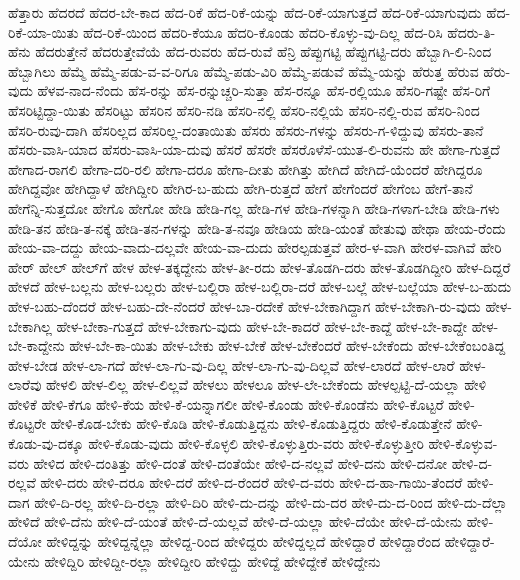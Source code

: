 ಹೆತ್ತಾರು
ಹೆದರದೆ
ಹೆದರ-ಬೇ-ಕಾದ
ಹೆದ-ರಿಕೆ
ಹೆದ-ರಿಕೆ-ಯನ್ನು
ಹೆದ-ರಿಕೆ-ಯಾಗುತ್ತದೆ
ಹೆದ-ರಿಕೆ-ಯಾಗುವುದು
ಹೆದ-ರಿಕೆ-ಯಾ-ಯಿತು
ಹೆದ-ರಿಕೆ-ಯಿಂದ
ಹೆದರಿ-ಕೆಯೂ
ಹೆದರಿ-ಕೊಂಡು
ಹೆದರಿ-ಕೊಳ್ಳು-ವು-ದಿಲ್ಲ
ಹೆದ-ರಿಸಿ
ಹೆದರು-ತಿ-ಹೆನು
ಹೆದರುತ್ತೇನೆ
ಹೆದರುತ್ತೇವೆಯೆ
ಹೆದ-ರುವರು
ಹೆದ-ರುವೆ
ಹೆನ್ರಿ
ಹೆಪ್ಪುಗಟ್ಟಿ
ಹೆಪ್ಪುಗಟ್ಟಿ-ದರು
ಹೆಬ್ಬಾಗಿ-ಲಿ-ನಿಂದ
ಹೆಬ್ಬಾಗಿಲು
ಹೆಮ್ಮೆ
ಹೆಮ್ಮೆ-ಪಡು-ವ-ವ-ರಿಗೂ
ಹೆಮ್ಮೆ-ಪಡು-ವಿರಿ
ಹೆಮ್ಮೆ-ಪಡುವೆ
ಹೆಮ್ಮೆ-ಯನ್ನು
ಹೆರುತ್ತ
ಹೆರುವ
ಹೆರು-ವುದು
ಹೆಳವ-ನಾದ-ನೆಂದು
ಹೆಸ-ರನ್ನು
ಹೆಸ-ರನ್ನುಚ್ಚರಿ-ಸುತ್ತಾ
ಹೆಸ-ರನ್ನೂ
ಹೆಸ-ರಲ್ಲಿಯೂ
ಹೆಸರಿ-ಗಷ್ಟೇ
ಹೆಸ-ರಿಗೆ
ಹೆಸರಿಟ್ಟಿದ್ದಾ-ಯಿತು
ಹೆಸರಿಟ್ಟು
ಹೆಸರಿನ
ಹೆಸರಿ-ನಡಿ
ಹೆಸರಿ-ನಲ್ಲಿ
ಹೆಸರಿ-ನಲ್ಲಿಯೆ
ಹೆಸರಿ-ನಲ್ಲಿ-ರುವ
ಹೆಸರಿ-ನಿಂದ
ಹೆಸರಿ-ರುವು-ದಾಗಿ
ಹೆಸರಿಲ್ಲದ
ಹೆಸರಿಲ್ಲ-ದಂತಾಯಿತು
ಹೆಸರು
ಹೆಸರು-ಗಳನ್ನು
ಹೆಸರು-ಗ-ಳಿದ್ದುವು
ಹೆಸರು-ತಾನೆ
ಹೆಸರು-ವಾಸಿ-ಯಾದ
ಹೆಸರು-ವಾಸಿ-ಯಾ-ದುವು
ಹೆಸರೆ
ಹೆಸರೇ
ಹೆಸರೊಳೆಸೆ-ಯುತ-ಲಿ-ರುವನು
ಹೇ
ಹೇಗಾ-ಗುತ್ತದೆ
ಹೇಗಾದ-ರಾಗಲಿ
ಹೇಗಾ-ದರಿ-ರಲಿ
ಹೇಗಾ-ದರೂ
ಹೇಗಾ-ದೀತು
ಹೇಗಿತ್ತು
ಹೇಗಿದೆ
ಹೇಗಿದೆ-ಯೆಂದರೆ
ಹೇಗಿದ್ದರೂ
ಹೇಗಿದ್ದವೋ
ಹೇಗಿದ್ದಾಳೆ
ಹೇಗಿದ್ದೀರಿ
ಹೇಗಿರ-ಬ-ಹುದು
ಹೇಗಿ-ರುತ್ತದೆ
ಹೇಗೆ
ಹೇಗೆಂದರೆ
ಹೇಗೆಂಬ
ಹೇಗೆ-ತಾನೆ
ಹೇಗೆನ್ನಿ-ಸುತ್ತದೋ
ಹೇಗೊ
ಹೇಗೋ
ಹೇಡಿ
ಹೇಡಿ-ಗಲ್ಲ
ಹೇಡಿ-ಗಳ
ಹೇಡಿ-ಗಳನ್ನಾಗಿ
ಹೇಡಿ-ಗಳಾಗ-ಬೇಡಿ
ಹೇಡಿ-ಗಳು
ಹೇಡಿ-ತನ
ಹೇಡಿ-ತ-ನಕ್ಕೆ
ಹೇಡಿ-ತನ-ಗಳನ್ನು
ಹೇಡಿ-ತ-ನವೂ
ಹೇಡಿಯ
ಹೇಡಿ-ಯಂತೆ
ಹೇತುವು
ಹೇಥಾ
ಹೇಯ-ರೆಂದು
ಹೇಯ-ವಾ-ದದ್ದು
ಹೇಯ-ವಾದು-ದಲ್ಲವೇ
ಹೇಯ-ವಾ-ದುದು
ಹೇರಲ್ಪಡುತ್ತವೆ
ಹೇರ-ಳ-ವಾಗಿ
ಹೇರಳ-ವಾಗಿವೆ
ಹೇರಿ
ಹೇರ್‌
ಹೇಲ್
ಹೇಲ್‌ಗೆ
ಹೇಳ
ಹೇಳ-ತಕ್ಕದ್ದೇನು
ಹೇಳ-ತೀ-ರದು
ಹೇಳ-ತೊಡಗಿ-ದರು
ಹೇಳ-ತೊಡಗಿದ್ದೀರಿ
ಹೇಳ-ದಿದ್ದರೆ
ಹೇಳದೆ
ಹೇಳ-ಬಲ್ಲನು
ಹೇಳ-ಬಲ್ಲರು
ಹೇಳ-ಬಲ್ಲಿರಾ
ಹೇಳ-ಬಲ್ಲಿರಾ-ದರೆ
ಹೇಳ-ಬಲ್ಲೆ
ಹೇಳ-ಬಲ್ಲೆಯಾ
ಹೇಳ-ಬ-ಹುದು
ಹೇಳ-ಬಹು-ದೆಂದರೆ
ಹೇಳ-ಬಹು-ದೇ-ನೆಂದರೆ
ಹೇಳ-ಬಾ-ರದೇಕೆ
ಹೇಳ-ಬೇಕಾಗಿದ್ದಾಗ
ಹೇಳ-ಬೇಕಾಗಿ-ರು-ವುದು
ಹೇಳ-ಬೇಕಾಗಿಲ್ಲ
ಹೇಳ-ಬೇಕಾ-ಗುತ್ತದೆ
ಹೇಳ-ಬೇಕಾಗು-ವುದು
ಹೇಳ-ಬೇ-ಕಾದರೆ
ಹೇಳ-ಬೇ-ಕಾದ್ದೆ
ಹೇಳ-ಬೇ-ಕಾದ್ದೇ
ಹೇಳ-ಬೇ-ಕಾದ್ದೇನು
ಹೇಳ-ಬೇ-ಕಾ-ಯಿತು
ಹೇಳ-ಬೇಕು
ಹೇಳ-ಬೇಕೆ
ಹೇಳ-ಬೇಕೆಂದರೆ
ಹೇಳ-ಬೇಕೆಂದು
ಹೇಳ-ಬೇಕೆಂಬಂತಿದ್ದ
ಹೇಳ-ಬೇಡ
ಹೇಳ-ಲಾ-ಗದೆ
ಹೇಳ-ಲಾ-ಗು-ವು-ದಿಲ್ಲ
ಹೇಳ-ಲಾ-ಗು-ವು-ದಿಲ್ಲವೆ
ಹೇಳ-ಲಾರದೆ
ಹೇಳ-ಲಾರೆ
ಹೇಳ-ಲಾರೆವು
ಹೇಳಲಿ
ಹೇಳ-ಲಿಲ್ಲ
ಹೇಳ-ಲಿಲ್ಲವೆ
ಹೇಳಲು
ಹೇಳಲೂ
ಹೇಳ-ಲೇ-ಬೇಕೆಂದು
ಹೇಳಲ್ಪಟ್ಟಿ-ದೆ-ಯಲ್ಲಾ
ಹೇಳಿ
ಹೇಳಿಕೆ
ಹೇಳಿ-ಕೆಗೂ
ಹೇಳಿ-ಕೆಯ
ಹೇಳಿ-ಕೆ-ಯನ್ನಾಗಲೀ
ಹೇಳಿ-ಕೊಂಡು
ಹೇಳಿ-ಕೊಂಡೆನು
ಹೇಳಿ-ಕೊಟ್ಟರೆ
ಹೇಳಿ-ಕೊಟ್ಟರೇ
ಹೇಳಿ-ಕೊಡ-ಬೇಕು
ಹೇಳಿ-ಕೊಡಿ
ಹೇಳಿ-ಕೊಡುತ್ತಿದ್ದನು
ಹೇಳಿ-ಕೊಡುತ್ತಿದ್ದರು
ಹೇಳಿ-ಕೊಡುತ್ತೇನೆ
ಹೇಳಿ-ಕೊಡು-ವು-ದಕ್ಕೂ
ಹೇಳಿ-ಕೊಡು-ವುದು
ಹೇಳಿ-ಕೊಳ್ಳಲಿ
ಹೇಳಿ-ಕೊಳ್ಳುತ್ತಿರು-ವರು
ಹೇಳಿ-ಕೊಳ್ಳುತ್ತೀರಿ
ಹೇಳಿ-ಕೊಳ್ಳುವ-ವರು
ಹೇಳಿದ
ಹೇಳಿ-ದಂತಿತ್ತು
ಹೇಳಿ-ದಂತೆ
ಹೇಳಿ-ದಂತೆಯೇ
ಹೇಳಿ-ದ-ನಲ್ಲವೆ
ಹೇಳಿ-ದನು
ಹೇಳಿ-ದನೋ
ಹೇಳಿ-ದ-ರಲ್ಲವೆ
ಹೇಳಿ-ದರು
ಹೇಳಿ-ದರೂ
ಹೇಳಿ-ದರೆ
ಹೇಳಿ-ದ-ರೆಂದರೆ
ಹೇಳಿ-ದ-ವರು
ಹೇಳಿ-ದ-ಹಾ-ಗಾಯಿ-ತೆಂದರೆ
ಹೇಳಿ-ದಾಗ
ಹೇಳಿ-ದಿ-ರಲ್ಲ
ಹೇಳಿ-ದಿ-ರಲ್ಲಾ
ಹೇಳಿ-ದಿರಿ
ಹೇಳಿ-ದು-ದನ್ನು
ಹೇಳಿ-ದು-ದರ
ಹೇಳಿ-ದು-ದ-ರಿಂದ
ಹೇಳಿ-ದು-ದೆಲ್ಲಾ
ಹೇಳಿದೆ
ಹೇಳಿ-ದೆನು
ಹೇಳಿ-ದೆ-ಯಂತೆ
ಹೇಳಿ-ದೆ-ಯಲ್ಲವೆ
ಹೇಳಿ-ದೆ-ಯಲ್ಲಾ
ಹೇಳಿ-ದೆಯೇ
ಹೇಳಿ-ದೆ-ಯೇನು
ಹೇಳಿ-ದೆಯೋ
ಹೇಳಿದ್ದನ್ನು
ಹೇಳಿದ್ದನ್ನೆಲ್ಲಾ
ಹೇಳಿದ್ದ-ರಿಂದ
ಹೇಳಿದ್ದರು
ಹೇಳಿದ್ದಲ್ಲದೆ
ಹೇಳಿದ್ದಾರೆ
ಹೇಳಿದ್ದಾರೆಂದ
ಹೇಳಿದ್ದಾರೆ-ಯೇನು
ಹೇಳಿದ್ದಿರಿ
ಹೇಳಿದ್ದೀ-ರಲ್ಲಾ
ಹೇಳಿದ್ದೀರಿ
ಹೇಳಿದ್ದು
ಹೇಳಿದ್ದೆ
ಹೇಳಿದ್ದೇಕೆ
ಹೇಳಿದ್ದೇನು
